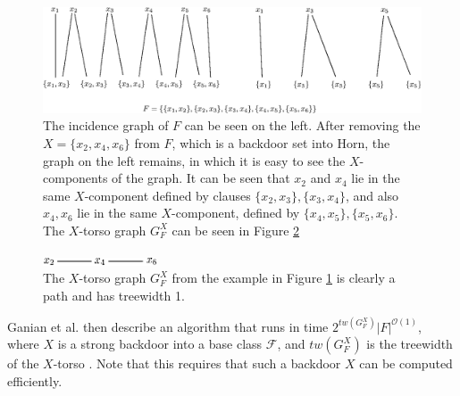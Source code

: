 \documentclass[11pt,a4paper]{article}
\theoremstyle{definition}
\theoremstyle{proposition}
\begin{document}
\begin{figure}[h]
        \centering
        \includegraphics[width=1\textwidth]{figures/backdoortreewidth.eps}
	\caption{The incidence graph of $F$ can be seen on the left. After removing the $X = \{x_2, x_4, x_6\}$ from $F$, which is a backdoor set into Horn, the graph on the left remains, in which it is easy to see the $X$-components of the graph. It can be seen that $x_2$ and $x_4$ lie in the same $X$-component defined by clauses $\{x_2,x_3\}, \{x_3,x_4\}$, and also $x_4, x_6$ lie in the same $X$-component, defined by $\{x_4,x_5\}, \{x_5,x_6\}$. The $X$-torso graph $G_F^X$ can be seen in Figure \ref{fig:backdoortreewidth-2}}
	\label{fig:backdoortreewidth-1}
\end{figure}
\begin{figure}[h]
        \centering
        \includegraphics[width=0.3\textwidth]{figures/backdoortreewidth2.eps}   
	\caption{The $X$-torso graph $G_F^X$ from the example in Figure \ref{fig:backdoortreewidth-1} is clearly a path and has treewidth 1.}
	\label{fig:backdoortreewidth-2}
\end{figure}

Ganian et al. then describe an algorithm that runs in time $2^{tw(G_F^X)}|F|^{\mathcal{O}(1)}$, where $X$ is a strong backdoor into a base class $\mathcal{F}$, and $tw(G_F^X)$ is the treewidth of the $X$-torso \cite[p.27]{GanianBackdoorTreewidth}. Note that this requires that such a backdoor $X$ can be computed efficiently. 
\end{document}
